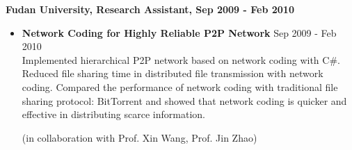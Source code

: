 {\bf Fudan University, Research Assistant, Sep 2009 - Feb
  2010}

\begin{itemize}
\item {\bf Network Coding for Highly Reliable P2P Network} \hfill Sep 2009 - Feb 2010\\
Implemented hierarchical P2P network based on network coding with C$\#$. Reduced
file sharing time in distributed file transmission with network coding. Compared
the performance of network coding with traditional file sharing protocol:
BitTorrent and showed that network coding is quicker and effective in
distributing scarce information.

(in collaboration with Prof. Xin Wang, Prof. Jin Zhao)
\end{itemize}



